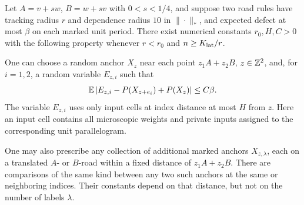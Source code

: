 \begin{lemma}
\label{found:lem-network}
Let $A=v+sw$, $B=w+sv$ with $0<s<1/4$, and suppose two road rules have
tracking radius $r$ and dependence radius $10$ in $\|\cdot\|_*$, and
expected defect at most $\beta$ on each marked unit period.  There
exist numerical constants $r_0,H,C>0$ with the following property
whenever $r<r_0$ and $n\geq K_{\rm lat}/r$.

One can choose a random anchor $X_z$ near each point $z_1A+z_2B$,
$z\in\mathbb Z^2$, and, for $i=1,2$, a random variable $E_{z,i}$ such
that
\begin{equation}
 \mathbb E \left|E_{z,i}-P(X_{z+e_i})+P(X_z)\right|
 \leq C\beta.                                      \label{found:eq-increment}
\end{equation}
The variable $E_{z,i}$ uses only input cells at index distance at most
$H$ from $z$.  Here an input cell contains all microscopic weights and
private inputs assigned to the corresponding unit parallelogram.

One may also prescribe any collection of additional marked anchors
$X_{z,\lambda}$, each on a translated $A$- or $B$-road within a fixed
distance of $z_1A+z_2B$.  There are comparisons of the same kind between
any two such anchors at the same or neighboring indices.  Their constants
depend on that distance, but not on the number of labels $\lambda$.
\end{lemma}

